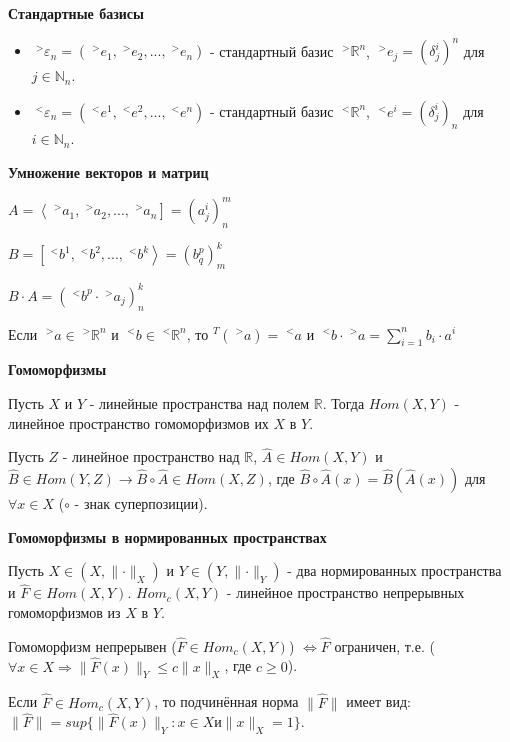 \documentclass[__main__.tex]{subfiles}
\begin{document}
\textbf{Стандартные базисы}

\begin{itemize}
  \item
        $\;^{>}\varepsilon_n = (\;^{>}e_1, \;^{>}e_2, ... , \;^{>}e_n)$ - стандартный базис $\;^{>}\mathbb{R}^n$, $\;^{>}e_j = (\delta^i_j)^n$ для $j \in \mathbb{N}_n$.

  \item
        $\;^{<}\varepsilon_n = (\;^{<}e^1, \;^{<}e^2, ... , \;^{<}e^n)$ - стандартный базис $\;^{<}\mathbb{R}^n$, $\;^{<}e^i = (\delta^i_j)_n$ для $i \in \mathbb{N}_n$.
\end{itemize}

\textbf{Умножение векторов и матриц}

$A = \left< \;^{>}a_1, \;^{>}a_2, ... , \;^{>}a_n \right] = (a^i_j)^m_n$

$B = \left[ \;^{<}b^1, \;^{<}b^2, ... , \;^{<}b^k \right> = (b^p_q)^k_m$

$B \cdot A = (\;^{<}b^p \cdot \;^{>}a_j)^k_n$

Если $\;^{>}a \in \;^{>}\mathbb{R}^n$ и $\;^{<}b \in \;^{<}\mathbb{R}^n$, то $^{T}(\;^{>}a) = \;^{<}a$ и $\;^{<}b \cdot \;^{>}a = \sum_{i = 1}^{n} b_i \cdot a^i$

\textbf{Гомоморфизмы}

Пусть $X$ и $Y$ - линейные пространства над полем $\mathbb{R}$. Тогда $Hom(X,Y)$ - линейное пространство гомоморфизмов их $X$ в $Y$.

Пусть $Z$ - линейное пространство над $\mathbb{R}$, $\hat{A} \in Hom(X,Y)$ и $\hat{B} \in Hom(Y,Z) \rightarrow \hat{B} \circ \hat{A} \in Hom (X,Z)$, где $\hat{B} \circ \hat{A} (x) = \hat{B}(\hat{A}(x))$ для $\forall x \in X$ ($\circ$ - знак суперпозиции).

\textbf{Гомоморфизмы в нормированных пространствах}

Пусть $X \in (X, \lVert \cdot \rVert_X)$ и $Y \in (Y, \lVert \cdot \rVert_Y)$ - два нормированных пространства и $\hat{F} \in Hom(X,Y)$. $Hom_c(X,Y)$ - линейное пространство непрерывных гомоморфизмов из $X$ в $Y$.

\begin{statement}
  Гомоморфизм непрерывен ($\hat{F} \in Hom_c(X,Y)$) $\Leftrightarrow \hat{F}$ ограничен, т.е. ($\forall x \in X \Rightarrow \lVert \hat{F}(x) \rVert_Y \leqslant c \lVert x \rVert_X$, где $c \geqslant 0$).
\end{statement}

\begin{definition}
  Если $\hat{F} \in Hom_c(X,Y)$, то подчинённая норма $\lVert \hat{F} \rVert$ имеет вид: $\lVert \hat{F} \rVert = sup \lbrace \lVert \hat{F}(x) \rVert_Y : x \in X и \lVert x \rVert_X = 1 \rbrace$.
\end{definition}
\end{document}
